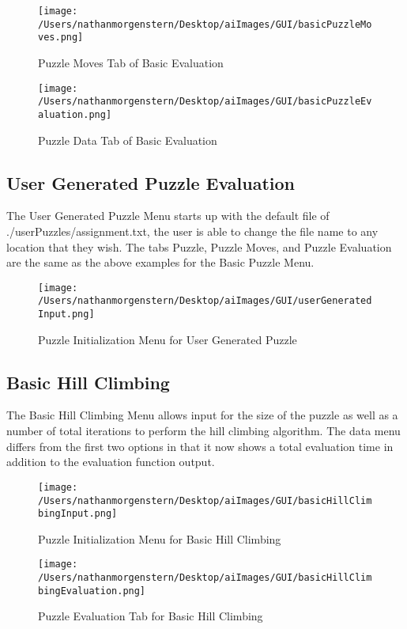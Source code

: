 \documentclass{report}
\begin{document}
	\begin{figure}[H]
	\centering
	\texttt{[image: /Users/nathanmorgenstern/Desktop/aiImages/GUI/basicPuzzleMoves.png]}
	\caption{Puzzle Moves Tab of Basic Evaluation}
	\label{fig: Puzzle Moves Tab of Basic Evaluation}
	\end{figure}

	\begin{figure}[H]
	\centering
	\texttt{[image: /Users/nathanmorgenstern/Desktop/aiImages/GUI/basicPuzzleEvaluation.png]}
	\caption{Puzzle Data Tab of Basic Evaluation}
	\label{fig: Puzzle Data Tab of Basic Evaluation}
	\end{figure}

\subsection{User Generated Puzzle Evaluation}
The User Generated Puzzle Menu starts up with the default file of ./userPuzzles/assignment.txt, the user is able to change the file name to any location that they wish. The tabs Puzzle, Puzzle Moves, and Puzzle Evaluation are the same as the above examples for the Basic Puzzle Menu.

	\begin{figure}[H]
	\centering
	\texttt{[image: /Users/nathanmorgenstern/Desktop/aiImages/GUI/userGeneratedInput.png]}
	\caption{Puzzle Initialization Menu for User Generated Puzzle}
	\label{fig: Puzzle Initialization Menu for User Generated Puzzle}
	\end{figure}


\subsection{Basic Hill Climbing}
The Basic Hill Climbing Menu allows input for the size of the puzzle as well as a number of total iterations to perform the hill climbing algorithm. The data menu differs from the first two options in that it now shows a total evaluation time in addition to the evaluation function output.

	\begin{figure}[H]
	\centering
	\texttt{[image: /Users/nathanmorgenstern/Desktop/aiImages/GUI/basicHillClimbingInput.png]}
	\caption{Puzzle Initialization Menu for Basic Hill Climbing}
	\label{fig: Puzzle Initialization Menu for Basic Hill Climbing}
	\end{figure}
	
	\begin{figure}[H]
	\centering
	\texttt{[image: /Users/nathanmorgenstern/Desktop/aiImages/GUI/basicHillClimbingEvaluation.png]}
	\caption{Puzzle Evaluation Tab for Basic Hill Climbing}
	\label{fig: Puzzle Evaluation Tab for Basic Hill Climbing}
	\end{figure}
\end{document}
